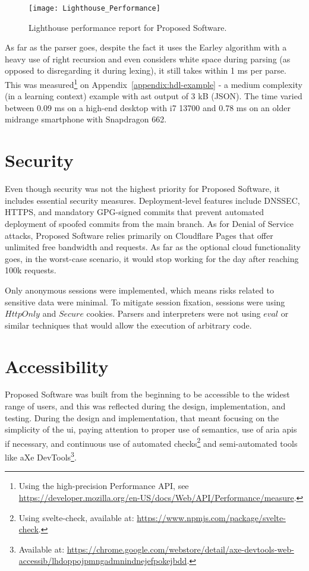 \begin{figure}[H]
    \centering
    \texttt{[image: Lighthouse\_Performance]}
    \caption{Lighthouse performance report for Proposed Software.}
    \label{fig:design-lighthouse-performance}
\end{figure}

As far as the parser goes, despite the fact it uses the Earley algorithm with a heavy use of right recursion and even considers white space during parsing (as opposed to disregarding it during lexing), it still takes within 1 ms per parse.
This was measured\footnote{Using the high-precision Performance API, see \url{https://developer.mozilla.org/en-US/docs/Web/API/Performance/measure}.} on Appendix~\ref{appendix:hdl-example} - a medium complexity (in a learning context) example with \gls{ast} output of 3 kB (JSON).
The time varied between 0.09 ms on a high-end desktop with i7 13700 and 0.78 ms on an older midrange smartphone with Snapdragon 662.

\section{Security}

Even though security was not the highest priority for Proposed Software, it includes essential security measures.
Deployment-level features include DNSSEC, HTTPS, and mandatory GPG-signed commits that prevent automated deployment of spoofed commits from the main branch.
As for Denial of Service attacks, Proposed Software relies primarily on Cloudflare Pages that offer unlimited free bandwidth and requests.
As far as the optional cloud functionality goes, in the worst-case scenario, it would stop working for the day after reaching 100k requests.

Only anonymous sessions were implemented, which means risks related to sensitive data were minimal.
To mitigate session fixation, sessions were using $HttpOnly$ and $Secure$ cookies.
Parsers and interpreters were not using $eval$ or similar techniques that would allow the execution of arbitrary code.

\section{Accessibility}

Proposed Software was built from the beginning to be accessible to the widest range of users, and this was reflected during the design, implementation, and testing.
During the design and implementation, that meant focusing on the simplicity of the \gls{ui}, paying attention to proper use of semantics, use of \gls{aria} \glspl{api} if necessary, and continuous use of automated checks\footnote{Using svelte-check, available at: \url{https://www.npmjs.com/package/svelte-check}.} and semi-automated tools like aXe DevTools\footnote{Available at: \url{https://chrome.google.com/webstore/detail/axe-devtools-web-accessib/lhdoppojpmngadmnindnejefpokejbdd}.}.

